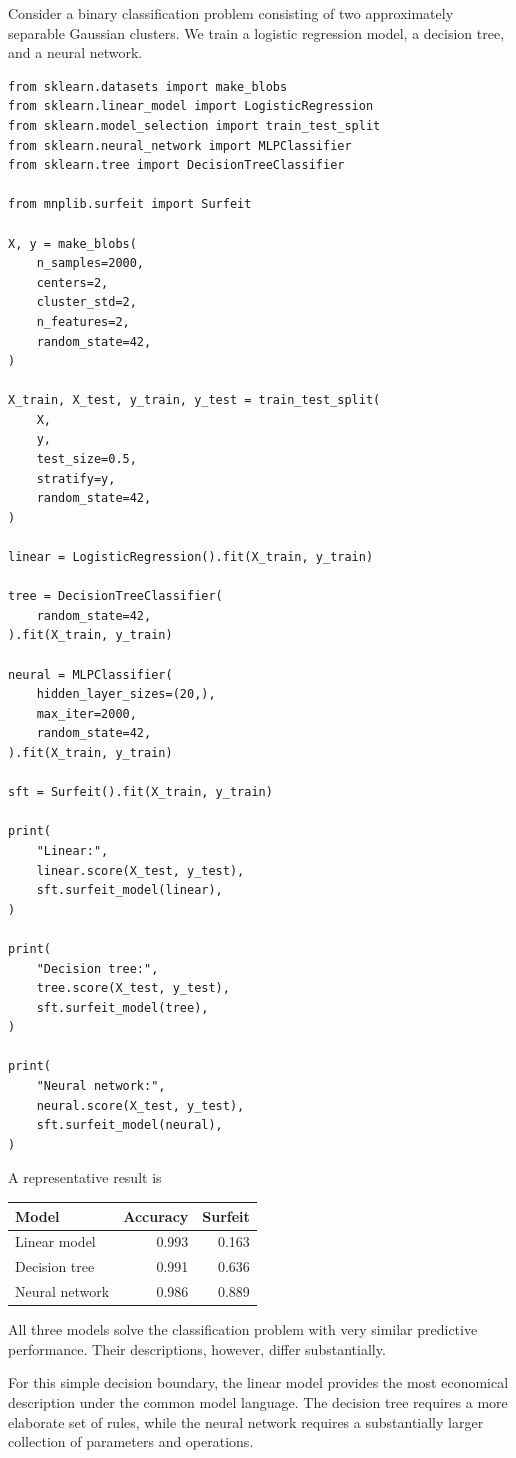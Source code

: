 \begin{example}
\label{ex:machine_learning:surfeit:model_families}

Consider a binary classification problem consisting of two approximately separable Gaussian clusters. We train a logistic regression model, a decision tree, and a neural network.

\begin{sourcecode}
{\scriptsize
\begin{verbatim}
from sklearn.datasets import make_blobs
from sklearn.linear_model import LogisticRegression
from sklearn.model_selection import train_test_split
from sklearn.neural_network import MLPClassifier
from sklearn.tree import DecisionTreeClassifier

from mnplib.surfeit import Surfeit

X, y = make_blobs(
    n_samples=2000,
    centers=2,
    cluster_std=2,
    n_features=2,
    random_state=42,
)

X_train, X_test, y_train, y_test = train_test_split(
    X,
    y,
    test_size=0.5,
    stratify=y,
    random_state=42,
)

linear = LogisticRegression().fit(X_train, y_train)

tree = DecisionTreeClassifier(
    random_state=42,
).fit(X_train, y_train)

neural = MLPClassifier(
    hidden_layer_sizes=(20,),
    max_iter=2000,
    random_state=42,
).fit(X_train, y_train)

sft = Surfeit().fit(X_train, y_train)

print(
    "Linear:",
    linear.score(X_test, y_test),
    sft.surfeit_model(linear),
)

print(
    "Decision tree:",
    tree.score(X_test, y_test),
    sft.surfeit_model(tree),
)

print(
    "Neural network:",
    neural.score(X_test, y_test),
    sft.surfeit_model(neural),
)
\end{verbatim}}
\end{sourcecode}

A representative result is

\begin{center}
\begin{tabular}{lrr}
\hline
Model & Accuracy & Surfeit \\
\hline
Linear model   & 0.993 & 0.163 \\
Decision tree  & 0.991 & 0.636 \\
Neural network & 0.986 & 0.889 \\
\hline
\end{tabular}
\end{center}

All three models solve the classification problem with very similar predictive performance. Their descriptions, however, differ substantially.

For this simple decision boundary, the linear model provides the most economical description under the common model language. The decision tree requires a more elaborate set of rules, while the neural network requires a substantially larger collection of parameters and operations.
\end{example}


